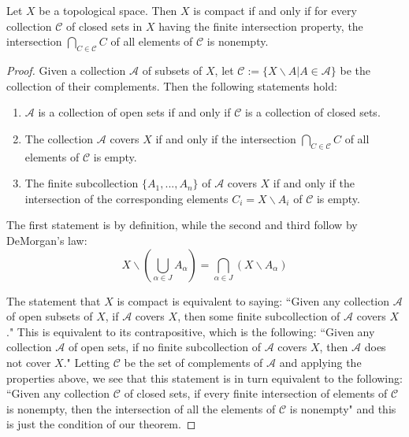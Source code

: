 \documentclass[12pt, a4paper, oneside, openright, titlepage]{book}
\begin{document}
\begin{theorem}
    Let $X$ be a topological space. Then $X$ is compact if and only if for every collection $\mathcal{C}$ of closed sets in $X$ having the finite intersection property, the intersection $\bigcap_{C\in\mathcal{C}}C$ of all elements of $\mathcal{C}$ is nonempty.
\end{theorem}
\begin{proof}
    Given a collection $\mathcal{A}$ of subsets of $X$, let $\mathcal{C} := \{X\backslash A\vert A \in \mathcal{A}\}$ be the collection of their complements. Then the following statements hold: \begin{enumerate}
        \item $\mathcal{A}$ is a collection of open sets if and only if $\mathcal{C}$ is a collection of closed sets.
        \item The collection $\mathcal{A}$ covers $X$ if and only if the intersection $\bigcap_{C\in\mathcal{C}}C$ of all elements of $\mathcal{C}$ is empty.
        \item The finite subcollection $\{A_1,...,A_n\}$ of $\mathcal{A}$ covers $X$ if and only if the intersection of the corresponding elements $C_i = X\backslash A_i$ of $\mathcal{C}$ is empty.
    \end{enumerate}
    The first statement is by definition, while the second and third follow by DeMorgan's law: \begin{equation*}
        X\backslash\left(\bigcup\limits_{\alpha \in J}A_{\alpha}\right) = \bigcap\limits_{\alpha \in J}(X\backslash A_{\alpha})
    \end{equation*}
    

    The statement that $X$ is compact is equivalent to saying: ``Given any collection $\mathcal{A}$ of open subsets of $X$, if $\mathcal{A}$ covers $X$, then some finite subcollection of $\mathcal{A}$ covers $X$." This is equivalent to its contrapositive, which is the following: ``Given any collection $\mathcal{A}$ of open sets, if no finite subcollection of $\mathcal{A}$ covers $X$, then $\mathcal{A}$ does not cover $X$." Letting $\mathcal{C}$ be the set of complements of $\mathcal{A}$ and applying the properties above, we see that this statement is in turn equivalent to the following: ``Given any collection $\mathcal{C}$ of closed sets, if every finite intersection of elements of $\mathcal{C}$ is nonempty, then the intersection of all the elements of $\mathcal{C}$ is nonempty" and this is just the condition of our theorem.
\end{proof}
\end{document}
